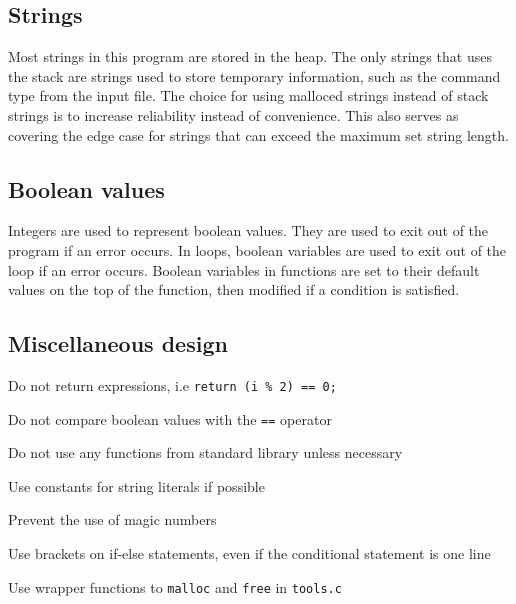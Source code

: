 \documentclass[a4paper, 12pt, titlepage]{article}
\newcommand{\code}[1]{\small\texttt{#1}\normalsize}
\begin{document}
\subsection{Strings}

Most strings in this program are stored in the heap. The only strings 
that uses the stack are strings used to store temporary information, 
such as the command type from the input file. The choice for using 
malloced strings instead of stack strings is to increase reliability 
instead of convenience. This also serves as covering the edge case 
for strings that can exceed the maximum set string length.

\subsection{Boolean values}

Integers are used to represent boolean values. They are used to exit 
out of the program if an error occurs. In loops, boolean variables are 
used to exit out of the loop if an error occurs. Boolean variables in 
functions are set to their default values on the top of the function, then 
modified if a condition is satisfied.

\subsection{Miscellaneous design}

\begin{itemize}[label={--}]
\begin{samepage}
    \item Do not return expressions, i.e \code{return (i \% 2) == 0;}
    \item Do not compare boolean values with the \code{==} operator
    \item Do not use any functions from standard library unless necessary
    \item Use constants for string literals if possible
    \item Prevent the use of magic numbers
    \item Use brackets on if-else statements, even if the conditional 
          statement is one line
    \item Use wrapper functions to \code{malloc} and \code{free} in 
          \code{tools.c}
\end{samepage}
\end{itemize}

\newpage
\end{document}
